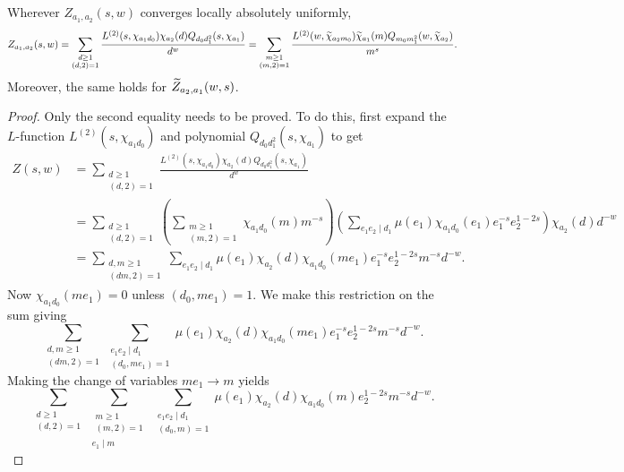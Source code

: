 \documentclass[12pt,reqno,oneside]{amsart}
\begin{document}
    \begin{theorem}[Interchange]
        Wherever $Z_{a_{1},a_{2}}(s,w)$ converges locally absolutely uniformly,
        \[
            Z_{a_{1},a_{2}}(s,w) = \sum_{\substack{d \ge 1 \\ (d,2) = 1}}\frac{L^{(2)}(s,\chi_{a_{1}d_{0}})\chi_{a_{2}}(d)Q_{d_{0}d_{1}^{2}}(s,\chi_{a_{1}})}{d^{w}} = \sum_{\substack{m \ge 1 \\ (m,2) = 1}}\frac{L^{(2)}(w,\widetilde{\chi}_{a_{2}m_{0}})\widetilde{\chi}_{a_{1}}(m)Q_{m_{0}m_{1}^{2}}(w,\widetilde{\chi}_{a_{2}})}{m^{s}}.
        \]
        Moreover, the same holds for $\widetilde{Z}_{a_{2},a_{1}}(w,s)$.
    \end{theorem}
    \begin{proof}
        Only the second equality needs to be proved. To do this, first expand the $L$-function $L^{(2)}(s,\chi_{a_{1}d_{0}})$ and polynomial $Q_{d_{0}d_{1}^{2}}(s,\chi_{a_{1}})$ to get
        \begin{align*}
            Z(s,w) &= \sum_{\substack{d \ge 1 \\ (d,2) = 1}}\frac{L^{(2)}(s,\chi_{a_{1}d_{0}})\chi_{a_{2}}(d)Q_{d_{0}d_{1}^{2}}(s,\chi_{a_{1}})}{d^{w}} \\
            &= \sum_{\substack{d \ge 1 \\ (d,2) = 1}}\left(\sum_{\substack{m \ge 1 \\ (m,2) = 1}}\chi_{a_{1}d_{0}}(m)m^{-s}\right)\left(\sum_{e_{1}e_{2} \mid d_{1}}\mu(e_{1})\chi_{a_{1}d_{0}}(e_{1})e_{1}^{-s}e_{2}^{1-2s}\right)\chi_{a_{2}}(d)d^{-w} \\
            &= \sum_{\substack{d,m \ge 1 \\ (dm,2) = 1}}\sum_{e_{1}e_{2} \mid d_{1}}\mu(e_{1})\chi_{a_{2}}(d)\chi_{a_{1}d_{0}}(me_{1})e_{1}^{-s}e_{2}^{1-2s}m^{-s}d^{-w}.
        \end{align*}
        Now $\chi_{a_{1}d_{0}}(me_{1}) = 0$ unless $(d_{0},me_{1}) = 1$. We make this restriction on the sum giving
        \[
            \sum_{\substack{d,m \ge 1 \\ (dm,2) = 1}}\sum_{\substack{e_{1}e_{2} \mid d_{1} \\ (d_{0},me_{1}) = 1}}\mu(e_{1})\chi_{a_{2}}(d)\chi_{a_{1}d_{0}}(me_{1})e_{1}^{-s}e_{2}^{1-2s}m^{-s}d^{-w}.
        \]
        Making the change of variables $me_{1} \to m$ yields
        \[
            \sum_{\substack{d \ge 1 \\ (d,2) = 1}}\sum_{\substack{\substack{m \ge 1 \\ (m,2) = 1} \\ e_{1} \mid m}}\sum_{\substack{e_{1}e_{2} \mid d_{1} \\ (d_{0},m) = 1}}\mu(e_{1})\chi_{a_{2}}(d)\chi_{a_{1}d_{0}}(m)e_{2}^{1-2s}m^{-s}d^{-w}.
\]
\end{proof}
\end{document}
